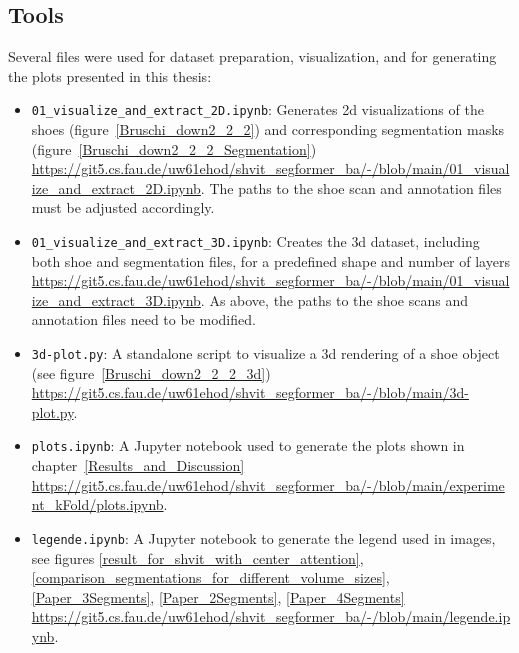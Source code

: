\subsection{Tools}
Several files were used for dataset preparation, visualization, and for generating the plots presented in this thesis:
\begin{itemize}
	\item {\tt 01\_visualize\_and\_extract\_2D.ipynb}: Generates \gls{2d} visualizations of the shoes (figure~\ref{Bruschi_down2_2_2}) and corresponding segmentation masks (figure~\ref{Bruschi_down2_2_2_Segmentation}) \url{https://git5.cs.fau.de/uw61ehod/shvit_segformer_ba/-/blob/main/01_visualize_and_extract_2D.ipynb}. The paths to the shoe scan and annotation files must be adjusted accordingly.
	\item {\tt 01\_visualize\_and\_extract\_3D.ipynb}: Creates the \gls{3d} dataset, including both shoe and segmentation files, for a predefined shape and number of layers \url{https://git5.cs.fau.de/uw61ehod/shvit_segformer_ba/-/blob/main/01_visualize_and_extract_3D.ipynb}. As above, the paths to the shoe scans and annotation files need to be modified.
	\item {\tt 3d-plot.py}: A standalone script to visualize a \gls{3d} rendering of a shoe object (see figure~\ref{Bruschi_down2_2_2_3d}) \url{https://git5.cs.fau.de/uw61ehod/shvit_segformer_ba/-/blob/main/3d-plot.py}.
	\item {\tt plots.ipynb}: A Jupyter notebook used to generate the plots shown in chapter~\ref{Results_and_Discussion} \url{https://git5.cs.fau.de/uw61ehod/shvit_segformer_ba/-/blob/main/experiment_kFold/plots.ipynb}.
	\item {\tt legende.ipynb}: A Jupyter notebook to generate the legend used in images, see figures \ref{result_for_shvit_with_center_attention}, \ref{comparison_segmentations_for_different_volume_sizes}, \ref{Paper_3Segments}, \ref{Paper_2Segments}, \ref{Paper_4Segments} \url{https://git5.cs.fau.de/uw61ehod/shvit_segformer_ba/-/blob/main/legende.ipynb}.
\end{itemize}
